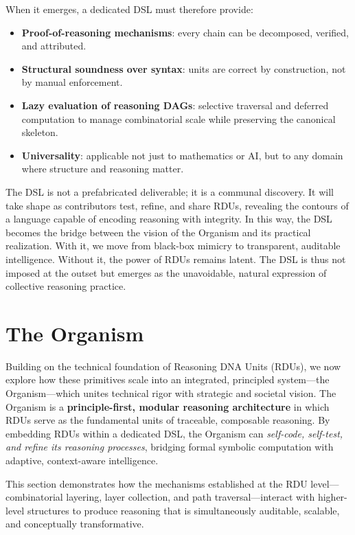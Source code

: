 \documentclass[12pt]{article}
\begin{document}
When it emerges, a dedicated DSL must therefore provide:
\begin{itemize}
    \item \textbf{Proof-of-reasoning mechanisms}: every chain can be decomposed, verified, and attributed.  
    \item \textbf{Structural soundness over syntax}: units are correct by construction, not by manual enforcement.  
    \item \textbf{Lazy evaluation of reasoning DAGs}: selective traversal and deferred computation to manage combinatorial scale while preserving the canonical skeleton.  
    \item \textbf{Universality}: applicable not just to mathematics or AI, but to any domain where structure and reasoning matter.  
\end{itemize}

The DSL is not a prefabricated deliverable; it is a communal discovery. It will take shape as contributors test, refine, and share RDUs, revealing the contours of a language capable of encoding reasoning with integrity. In this way, the DSL becomes the bridge between the vision of the Organism and its practical realization. With it, we move from black-box mimicry to transparent, auditable intelligence. Without it, the power of RDUs remains latent. The DSL is thus not imposed at the outset but emerges as the unavoidable, natural expression of collective reasoning practice.  

\section{The Organism}

Building on the technical foundation of Reasoning DNA Units (RDUs), we now explore how these primitives scale into an integrated, principled system—the Organism—which unites technical rigor with strategic and societal vision. The Organism is a \textbf{principle-first, modular reasoning architecture} in which RDUs serve as the fundamental units of traceable, composable reasoning. By embedding RDUs within a dedicated DSL, the Organism can \textit{self-code, self-test, and refine its reasoning processes}, bridging formal symbolic computation with adaptive, context-aware intelligence.

This section demonstrates how the mechanisms established at the RDU level—combinatorial layering, layer collection, and path traversal—interact with higher-level structures to produce reasoning that is simultaneously auditable, scalable, and conceptually transformative.
\end{document}
